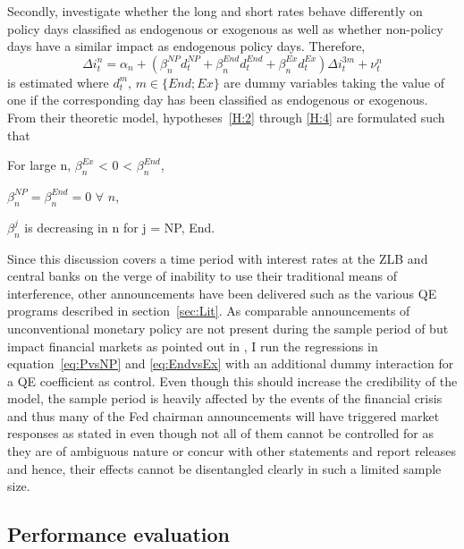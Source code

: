 Secondly, \textcite{Ellingsen.2003} investigate whether the long and short rates behave differently on policy days classified as endogenous or exogenous as well as whether non-policy days have a similar impact as endogenous policy days. Therefore, 
%
\begin{equation}
	\label{eq:EndvsEx}
	\Delta i_t^n = \alpha_n + (\beta_n^{NP}d_t^{NP}+\beta_n^{End}d_t^{End}+\beta_n^{Ex}d_t^{Ex})\Delta i_t^{3m}+\nu_t^n
\end{equation}
%
is estimated where $d_t^{m}$, $m\in \{End;Ex\}$ are dummy variables taking the value of one if the corresponding day has been classified as endogenous or exogenous. From their theoretic model, hypotheses~\ref{H:2} through \ref{H:4} are formulated such that
\begin{hypothesis}
	\label{H:2}
	For large n, $\beta_n^{Ex}$ < 0 < $\beta_n^{End}$,
\end{hypothesis}
%
\begin{hypothesis}
	\label{H:3}
	$\beta_n^{NP} = \beta_n^{End} = 0$ $\forall$ $n$,
\end{hypothesis}
%
\begin{hypothesis}
	\label{H:4}
	$\beta_n^{j}$ is decreasing in n for j = NP, End.
\end{hypothesis}
%

Since this discussion covers a time period with interest rates at the ZLB and central banks on the verge of inability to use their traditional means of interference, other announcements have been delivered such as the various QE programs described in section~\ref{sec:Lit}. As comparable announcements of unconventional monetary policy are not present during the sample period of \textcite{Ellingsen.2003} but impact financial markets as pointed out in \textcite{Hattori.2016}, I run the regressions in equation~\ref{eq:PvsNP} and \ref{eq:EndvsEx} with an additional dummy interaction for a QE coefficient as control. 
Even though this should increase the credibility of the model, the sample period is heavily affected by the events of the financial crisis and thus many of the Fed chairman announcements will have triggered market responses as stated in \textcite{Blinder.2010} even though not all of them cannot be controlled for as they are of ambiguous nature or concur with other statements and report releases and hence, their effects cannot be disentangled clearly in such a limited sample size.

%
\subsection{Performance evaluation}

